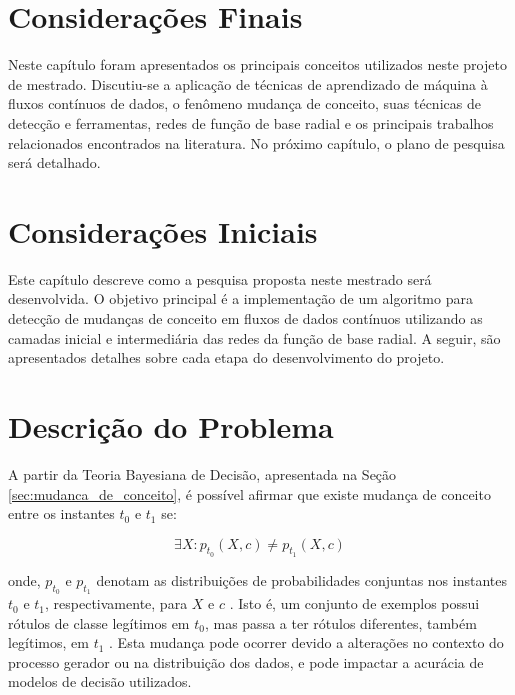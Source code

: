 \documentclass[qual, classic, a4paper]{ufbathesis}
\begin{document}
\section{Considerações Finais}

Neste capítulo foram apresentados os principais conceitos utilizados neste projeto de mestrado.
Discutiu-se a aplicação de técnicas de aprendizado de máquina à fluxos contínuos de dados,
o fenômeno mudança de conceito, suas técnicas de detecção e ferramentas,
redes de função de base radial e os principais trabalhos relacionados encontrados na literatura.
No próximo capítulo, o plano de pesquisa será detalhado.

 \label{plano_pesquisa}
\section{Considerações Iniciais}

Este capítulo descreve como a pesquisa proposta neste mestrado será desenvolvida.
O objetivo principal é a implementação de um algoritmo para detecção de mudanças de conceito em fluxos de dados contínuos utilizando as camadas inicial e intermediária das redes da função de base radial.
A seguir, são apresentados detalhes sobre cada etapa do desenvolvimento do projeto.

\section{Descrição do Problema}

A partir da Teoria Bayesiana de Decisão, apresentada na Seção \ref{sec:mudanca_de_conceito}, é possível afirmar que existe mudança de conceito entre os instantes $t_0$ e $t_1$ se:

\begin{equation} \label{eq:mudanca_de_conceito}
    {\exists}X : p_{t_0}(X, c) \ne p_{t_1}(X, c)
\end{equation}

onde, $p_{t_0}$ e $p_{t_1}$ denotam as distribuições de probabilidades conjuntas nos instantes $t_0$ e $t_1$, respectivamente, 
para $X$ e $c$ \cite{Gama:2014:SCD:2597757.2523813}. 
Isto é, um conjunto de exemplos possui rótulos de classe legítimos em $t_0$, mas passa a ter rótulos diferentes, também legítimos, em $t_1$ \cite{Kolter:2007:DWM:1314498.1390333}.
Esta mudança pode ocorrer devido a alterações no contexto do processo gerador ou na distribuição dos dados, 
e pode impactar a acurácia de modelos de decisão utilizados.
\end{document}
